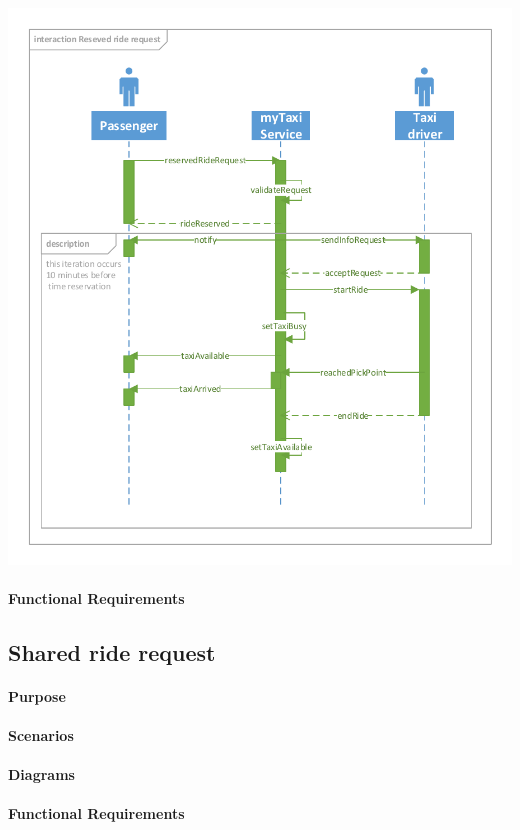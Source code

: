 \begin{center}
	\includegraphics[height=\textwidth]{diagrams/reserved_request}
\end{center}

\paragraph{Functional Requirements}

\subsection{Shared ride request}

\paragraph{Purpose}

\paragraph{Scenarios}

\paragraph{Diagrams}

\paragraph{Functional Requirements}

